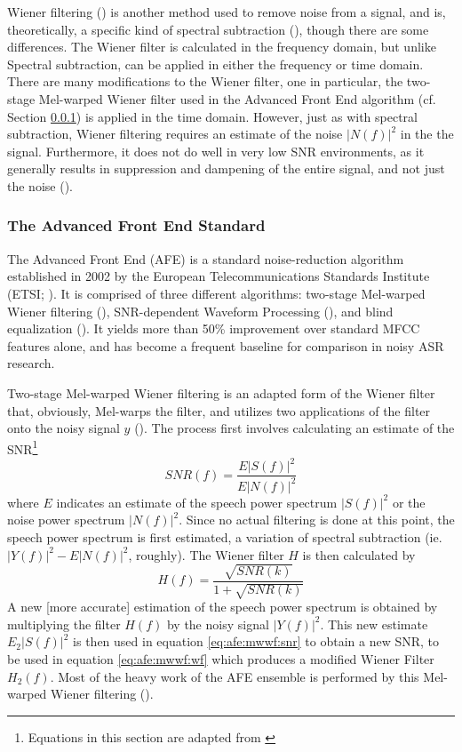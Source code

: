 Wiener filtering (\cite{lim:79}) is another method used to remove noise from a signal, and is, theoretically, a specific kind of spectral subtraction (\cite{agarwal:99}), though there are some differences. The Wiener filter is calculated in the frequency domain, but unlike Spectral subtraction, can be applied in either the frequency or time domain. There are many modifications to the Wiener filter, one in particular, the two-stage Mel-warped Wiener filter used in the Advanced Front End algorithm (cf. Section \ref{sec:background-afe}) is applied in the time domain.
However, just as with spectral subtraction, Wiener filtering requires an estimate of the noise $|N(f)|^2$ in the the signal.  Furthermore, it does not do well in very low SNR environments, as it generally results in suppression and dampening of the entire signal, and not just the noise (\cite{li:14}).


\subsubsection{The Advanced Front End Standard}\label{sec:background-afe}

The Advanced Front End (AFE) is a standard noise-reduction algorithm established in 2002 by the European Telecommunications Standards Institute (ETSI; \cite{etsi:02}).  It is comprised of three different algorithms: two-stage Mel-warped Wiener filtering (\cite{agarwal:99}), SNR-dependent Waveform Processing (\cite{macho:01}), and blind equalization (\cite{mauuary:98}).  It yields more than 50\% improvement over standard MFCC features alone, and has become a frequent baseline for comparison in noisy ASR research.

Two-stage Mel-warped Wiener filtering is an adapted form of the Wiener filter that, obviously, Mel-warps the filter, and utilizes two applications of the filter onto the noisy signal $y$ (\cite{etsi:02}).  The process first involves calculating an estimate of the SNR\footnote{Equations in this section are adapted from \cite{etsi:02}} \begin{equation}\label{eq:afe:mwwf:snr} SNR(f) = \dfrac{E|S(f)|^2}{E|N(f)|^2} \end{equation} where $E$ indicates an estimate of the speech power spectrum $|S(f)|^2$ or the noise power spectrum $|N(f)|^2$.  Since no actual filtering is done at this point, the speech power spectrum is first estimated, a variation of spectral subtraction (ie. $|Y(f)|^2 - E|N(f)|^2$, roughly).  The Wiener filter $H$ is then calculated by \begin{equation}\label{eq:afe:mwwf:wf} H(f) = \dfrac{\sqrt{SNR(k)}}{1+\sqrt{SNR(k)}} \end{equation}  A new [more accurate] estimation of the speech power spectrum is obtained by multiplying the filter $H(f)$ by the noisy signal $|Y(f)|^2$.  This new estimate $E_2|S(f)|^2$ is then used in equation \ref{eq:afe:mwwf:snr} to obtain a new SNR, to be used in equation \ref{eq:afe:mwwf:wf} which produces a modified Wiener Filter $H_2(f)$.  Most of the heavy work of the AFE ensemble is performed by this Mel-warped Wiener filtering (\cite{li:14}).

